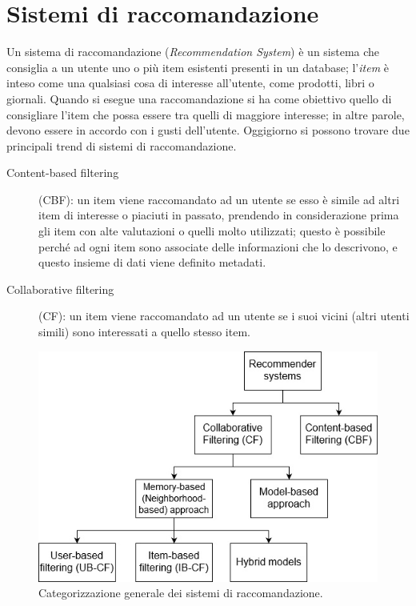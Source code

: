 \section{Sistemi di raccomandazione}
Un sistema di raccomandazione (\textit{Recommendation System}) è un sistema che consiglia a un utente uno o più item esistenti 
presenti in un database; l'\textit{item} è inteso come una qualsiasi cosa di interesse all'utente, come prodotti, libri o giornali. 
Quando si esegue una raccomandazione si ha come obiettivo quello di consigliare l'item che possa essere tra quelli di maggiore 
interesse; in altre parole, devono essere in accordo con i gusti dell'utente.\hfill\break
Oggigiorno si possono trovare due principali trend di sistemi di raccomandazione.
\begin{description}
    \item[Content-based filtering](CBF): un item viene raccomandato ad un utente se esso è simile ad altri item di interesse o piaciuti 
    in passato, prendendo in considerazione prima gli item con alte valutazioni o quelli molto utilizzati; questo è possibile perché ad 
    ogni item sono associate delle informazioni che lo descrivono, e questo insieme di dati viene definito metadati.
    \item[Collaborative filtering](CF): un item viene raccomandato ad un utente se i suoi vicini (altri utenti simili) sono 
    interessati a quello stesso item.
\end{description}
%
\begin{figure}[ht!]
    \centering
    \includegraphics[scale=0.7]{images/recommender_systems.jpg}
    \caption[Categorizzazione generale dei sistemi di raccomandazione]{Categorizzazione generale dei sistemi di raccomandazione.}
    \label{fig:recommender_systems}
\end{figure}

